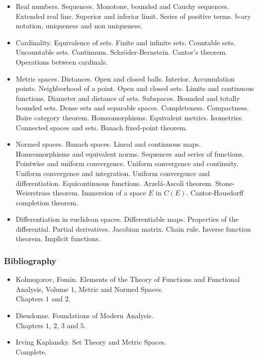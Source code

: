 \documentclass[spanish]{article}
\begin{document}
\begin{itemize}
  \item
Real numbers. Sequences. Monotone, bounded and Cauchy sequences.
Extended real line. Superior and inferior limit. Series of positive
terms. b-ary notation, uniqueness and non uniqueness.

  \item
Cardinality. Equivalence of sets. Finite and infinite sets. Countable
sets. Uncountable sets. Continuum. Schr\"oder-Bernstein. Cantor's theorem.
Operations between cardinals.

  \item
Metric spaces. Distances. Open and closed balls. Interior. Accumulation points.
Neighborhood of a point. Open and closed sets. Limits and continuous functions.
Diameter and distance of sets. Subspaces. Bounded and totally bounded sets.
Dense sets and separable spaces. Completeness. Compactness. Baire category
theorem. Homeomorphisms. Equivalent metrics. Isometries. Connected spaces and sets.
Banach fixed-point theorem.

  \item
Normed spaces. Banach spaces. Lineal and continuous maps. Homeomorphisms and
equivalent norms. Sequences and series of functions. Pointwise and uniform
convergence. Uniform convergence and continuity. Uniform convergence and
integration. Uniform convergence and differentiation. Equicontinuous functions.
Arzel\'a-Ascoli theorem. Stone-Weierstrass theorem. Immersion of a space $E$ in
$C(E)$. Cantor-Hausdorff completion theorem.

  \item
Differentiation in euclidean spaces. Differentiable maps. Properties of
the differential. Partial derivatives. Jacobian matrix. Chain rule. Inverse function
theorem. Implicit functions.
\end{itemize}



\subsubsection{Bibliography}
\begin{itemize}
  \item
Kolmogorov, Fomin. Elements of the Theory of Functions and Functional Analysis, Volume $1$,
Metric and Normed Spaces.\\
Chapters $1$ and $2$.

  \item
Dieudonne. Foundations of Modern Analysis.\\
Chapters $1$, $2$, $3$ and $5$.

  \item
Irving Kaplansky. Set Theory and Metric Spaces.\\
Complete.

\end{itemize}
\end{document}
